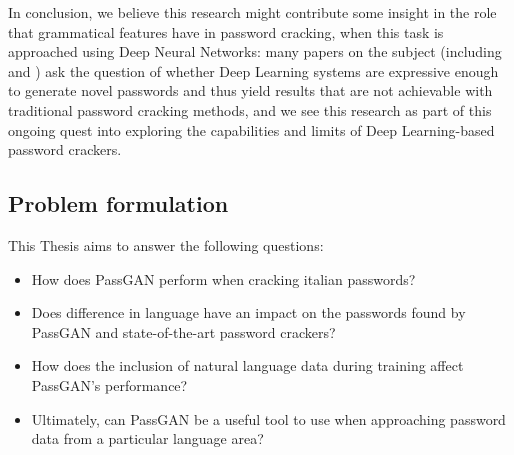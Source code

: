 In conclusion, we believe this research might contribute some insight in the role that grammatical features have in password cracking, when this task is approached using Deep Neural Networks: many papers on the subject (including \cite{PassGAN} and \cite{Melicher2016}) ask the question of whether Deep Learning systems are expressive enough to generate novel passwords and thus yield results that are not achievable with traditional password cracking methods, and we see this research as part of this ongoing quest into exploring the capabilities and limits of Deep Learning-based password crackers.

\subsection{Problem formulation}\label{subsec:problem-formulation}
This Thesis aims to answer the following questions:
\begin{itemize}
\item How does PassGAN perform when cracking italian passwords? %
\item Does difference in language have an impact on the passwords found by PassGAN and state-of-the-art password crackers?    
\item How does the inclusion of natural language data during training affect PassGAN's performance?
\item Ultimately, can PassGAN be a useful tool to use when approaching password data from a particular language area? %
\end{itemize}

